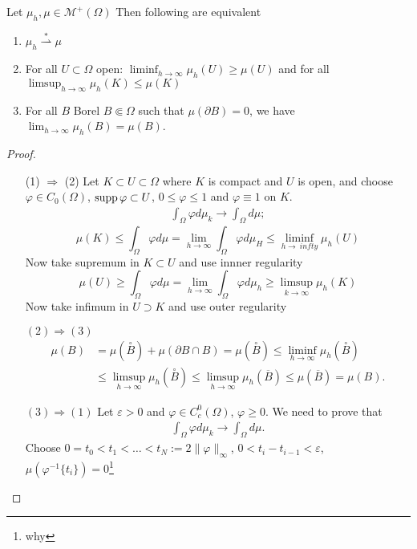 \begin{theorem}
Let $\mu_h, \mu \in \mathcal{M}^+(\Omega)$ Then following are equivalent
\begin{enumerate}[(1)]
\item $\mu_h \stackrel {*}{\rightharpoonup} \mu$ 
\item For all $U \subset \Omega$ open: $\liminf _{h\to \infty} \mu_h(U) \geq
\mu(U)$ and for all $\limsup_{h \to \infty} \mu_h(K) \leq \mu(K)$ 
\item For all $B$ Borel $B\Subset \Omega$ such that $\mu(\partial B) = 0$, we
have $\lim_{h\to \infty} \mu_h(B) = \mu(B)$.
\end{enumerate}
\end{theorem}
\begin{proof}
\TODO
\begin{enumerate}[(1)]
\item[(1) $\Rightarrow$ (2)] Let $K\subset U \subset \Omega$ where $K$ is compact and $U$ is open, and
choose $\varphi \in C_0(\Omega)$, $\operatorname{supp} \varphi \subset U$, $0 \leq \varphi
\leq 1$ and $\varphi \equiv 1$ on $K$.
\[
\begin{aligned}
\int_\Omega \varphi d\mu_k \to \int_\Omega d\mu;
\end{aligned}
\]
\TODO
\[
\mu(K) \leq \int_\Omega \varphi d\mu = \lim_{h\to \infty} \int_\Omega \varphi
d\mu_H \leq \liminf_{h\to\ infty} \mu_h(U)
\]
Now take supremum in $K \subset U$ and use innner regularity
\[
\mu(U) \geq \int_\Omega \varphi d\mu = \lim_{h\to \infty} \int_\Omega \varphi
d\mu_h \geq \limsup_{k\to \infty} \mu_h(K)
\]
Now take infimum in $U \supset K$ and use outer regularity
\item[$(2) \Rightarrow (3)$] 
\[
\begin{aligned}
\mu(B) &= \mu(\overset{\circ}{B}) + \mu(\partial B \cap B) =
\mu(\overset{\circ}{B}) \leq \liminf_{h\to\infty} \mu_h(\overset{\circ}{B}) 
\\ &\leq \limsup_{h\to\infty} \mu_h(\overset{\circ}{B})
\leq \limsup_{h\to\infty} \mu_h(\overline{B}) \leq \mu(\overline{B}) = \mu(B).
\end{aligned}
\]
\item[$(3) \Rightarrow (1)$] Let $\varepsilon >0$ and $\varphi \in
C^0_c(\Omega)$, $\varphi \geq 0$. We need to prove that 
\[
\begin{aligned}
\int_\Omega \varphi d\mu_k \to \int_\Omega d\mu.
\end{aligned}
\]
Choose $0 = t_0 < t_1 < \dots < t_N := 2\|\varphi\|_\infty$, 
$0 < t_i - t_{i-1} < \varepsilon$, $\mu(\varphi^{-1}\{t_i\}) = 0$\footnote{why
}
\end{enumerate}
\end{proof}
